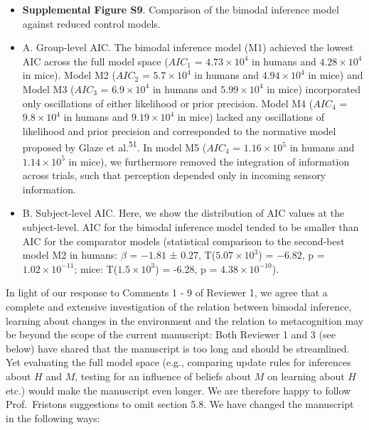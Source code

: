 \documentclass[
]{article}
\begin{document}
\begin{itemize}
\item
  \textbf{Supplemental Figure S9}. Comparison of the bimodal inference
  model against reduced control models.
\item
  A. Group-level AIC. The bimodal inference model (M1) achieved the
  lowest AIC across the full model space (\(AIC_1\) =
  \ensuremath{4.73\times 10^{4}} in humans and
  \ensuremath{4.28\times 10^{4}} in mice). Model M2 (\(AIC_2\) =
  \(\ensuremath{5.7\times 10^{4}}\) in humans and
  \(\ensuremath{4.94\times 10^{4}}\) in mice) and Model M3 (\(AIC_3\) =
  \(\ensuremath{6.9\times 10^{4}}\) in humans and
  \(\ensuremath{5.99\times 10^{4}}\) in mice) incorporated only
  oscillations of either likelihood or prior precision. Model M4
  (\(AIC_4\) = \(\ensuremath{9.8\times 10^{4}}\) in humans and
  \(\ensuremath{9.19\times 10^{4}}\) in mice) lacked any oscillations of
  likelihood and prior precision and corresponded to the normative model
  proposed by Glaze et al.\textsuperscript{51}. In model M5 (\(AIC_4\) =
  \(\ensuremath{1.16\times 10^{5}}\) in humans and
  \(\ensuremath{1.14\times 10^{5}}\) in mice), we furthermore removed
  the integration of information across trials, such that perception
  depended only in incoming sensory information.
\item
  B. Subject-level AIC. Here, we show the distribution of AIC values at
  the subject-level. AIC for the bimodal inference model tended to be
  smaller than AIC for the comparator models (statistical comparison to
  the second-best model M2 in humans: \(\beta\) = \(-1.81\) ± \(0.27\),
  T(\(\ensuremath{5.07\times 10^{3}}\)) = \(-6.82\), p =
  \(\ensuremath{1.02\times 10^{-11}}\); mice:
  T(\ensuremath{1.5\times 10^{3}}) = -6.28, p =
  \(\ensuremath{4.38\times 10^{-10}}\)).
\end{itemize}

In light of our response to Comments 1 - 9 of Reviewer 1, we agree that
a complete and extensive investigation of the relation between bimodal
inference, learning about changes in the environment and the relation to
metacognition may be beyond the scope of the current manuscript: Both
Reviewer 1 and 3 (see below) have shared that the manuscript is too long
and should be streamlined. Yet evaluating the full model space (e.g.,
comparing update rules for inferences about \(H\) and \(M\), testing for
an influence of beliefs about \(M\) on learning about \(H\) etc.) would
make the manuscript even longer. We are therefore happy to follow
Prof.~Fristons suggestions to omit section 5.8. We have changed the
manuscript in the following ways:
\end{document}
